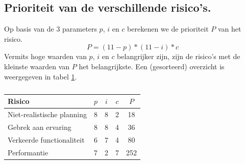 \subsection{Prioriteit van de verschillende risico's.} \label{sec:riskPriority}
Op basis van de 3 parameters $p$, $i$ en $c$ berekenen we de prioriteit $P$ van het risico. %
$$ P = (11 - p)*(11 - i)*c$$
Vermits hoge waarden van $p$, $i$ en $c$ belangrijker zijn, zijn de risico's met de kleinste waarden van $P$ het belangrijkste. Een (gesorteerd) overzicht is weergegeven in tabel \ref{tab:riskPriorityTabel}.
\begin{table} [H]
	\centering
	\caption{}
	\begin{tabular} {l|ccc|c}
		Risico & $p$ & $i$ & $c$ & $P$ \\
		\hline
		Niet-realistische planning 	& 8 	& 8 	& 2 	& 18 \\
		Gebrek aan ervaring 		& 8 	& 8 	& 4 	& 36 \\
		Verkeerde functionaliteit 	& 6 	& 7 	& 4 	& 80 \\
		Performantie 				& 7 	& 2 	& 7 	& 252\\

	\end{tabular}
	\label{tab:riskPriorityTabel}
\end{table}

